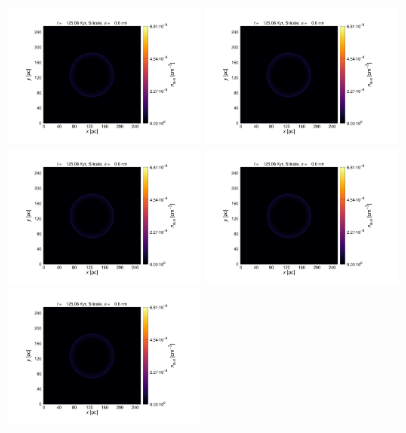 \documentclass[fleqn,usenatbib]{mnras}
\begin{document}
\begin{figure}
   \includegraphics[trim=2.8cm 1.5cm 9.3cm 2.0cm, clip=true,page=1,height = 3.6cm]{Pics/Pics_A2/Density_1_00501.pdf}\hspace*{-0.05cm}
   \includegraphics[trim=2.8cm 1.5cm 9.3cm 2.0cm, clip=true,page=2,height = 3.6cm]{Pics/Pics_A2/Density_1_00501.pdf}\hspace*{-0.05cm}
   \includegraphics[trim=2.8cm 1.5cm 9.3cm 2.0cm, clip=true,page=3,height = 3.6cm]{Pics/Pics_A2/Density_1_00501.pdf}\hspace*{-0.05cm}
   \includegraphics[trim=5.2cm 1.5cm 3.2cm 2.0cm, clip=true,page=4,height = 3.6cm]{Pics/Pics_A2/Density_1_00501.pdf}\hspace*{-0.05cm}
   \includegraphics[trim=2.8cm 1.5cm 9.3cm 2.0cm, clip=true,page=4,height = 3.6cm]{Pics/Pics_A2/Density_1_00501.pdf}\\

\end{figure}
\end{document}
